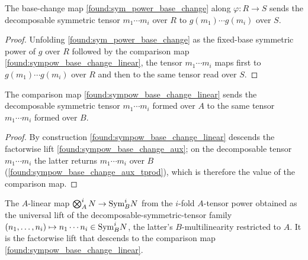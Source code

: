 \begin{lemma}
  \label{found:sym_base_change_map_tprod}
  The base-change map \cref{found:sym_power_base_change} along \(\varphi:R\to S\)
  sends the decomposable symmetric tensor \(m_1\cdots m_i\) over \(R\) to
  \(g(m_1)\cdots g(m_i)\) over \(S\).
\end{lemma}

\begin{proof}
  \leanok
  Unfolding \cref{found:sym_power_base_change} as the fixed-base symmetric power of
  \(g\) over \(R\) followed by the comparison map
  \cref{found:sympow_base_change_linear}, the tensor \(m_1\cdots m_i\) maps first
  to \(g(m_1)\cdots g(m_i)\) over \(R\) and then to the same tensor read over
  \(S\).
\end{proof}

\begin{lemma}
  \label{found:sympow_base_change_tprod}
  The comparison map \cref{found:sympow_base_change_linear} sends the decomposable
  symmetric tensor \(m_1\cdots m_i\) formed over \(A\) to the same tensor
  \(m_1\cdots m_i\) formed over \(B\).
\end{lemma}

\begin{proof}
  \leanok
  By construction \cref{found:sympow_base_change_linear} descends the factorwise
  lift \cref{found:sympow_base_change_aux}; on the decomposable tensor
  \(m_1\cdots m_i\) the latter returns \(m_1\cdots m_i\) over \(B\)
  (\cref{found:sympow_base_change_aux_tprod}), which is therefore the value of the
  comparison map.
\end{proof}

\begin{lemma}
  \label{found:sympow_base_change_aux}
  The \(A\)-linear map \(\bigotimes^i_A N\to\mathrm{Sym}^i_B N\) from the \(i\)-fold
  \(A\)-tensor power obtained as the universal lift of the
  decomposable-symmetric-tensor family
  \((n_1,\dots,n_i)\mapsto n_1\cdots n_i\in\mathrm{Sym}^i_B N\), the latter's
  \(B\)-multilinearity restricted to \(A\).  It is the factorwise lift that
  descends to the comparison map \cref{found:sympow_base_change_linear}.
\end{lemma}

